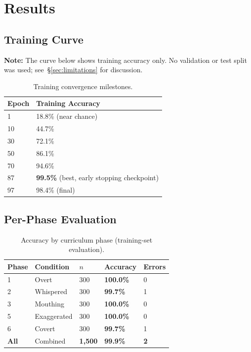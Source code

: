 \documentclass[11pt, a4paper]{article}
\begin{document}
\section{Results}
\label{sec:results}

\subsection{Training Curve}

\textbf{Note:} The curve below shows training accuracy only. No validation or test split was used; see~\S\ref{sec:limitations} for discussion.

\begin{table}[h]
\centering
\caption{Training convergence milestones.}
\label{tab:training_curve}
\begin{tabular}{@{}ll@{}}
\toprule
Epoch & Training Accuracy \\
\midrule
1  & 18.8\% (near chance) \\
10 & 44.7\% \\
30 & 72.1\% \\
50 & 86.1\% \\
70 & 94.6\% \\
87 & \textbf{99.5\%} (best, early stopping checkpoint) \\
97 & 98.4\% (final) \\
\bottomrule
\end{tabular}
\end{table}

\subsection{Per-Phase Evaluation}

\begin{table}[h]
\centering
\caption{Accuracy by curriculum phase (training-set evaluation).}
\label{tab:perphase}
\begin{tabular}{@{}lllll@{}}
\toprule
Phase & Condition & $n$ & Accuracy & Errors \\
\midrule
1 & Overt        & 300 & \textbf{100.0\%} & 0 \\
2 & Whispered    & 300 & \textbf{99.7\%}  & 1 \\
3 & Mouthing     & 300 & \textbf{100.0\%} & 0 \\
5 & Exaggerated  & 300 & \textbf{100.0\%} & 0 \\
6 & Covert       & 300 & \textbf{99.7\%}  & 1 \\
\midrule
\textbf{All} & Combined & \textbf{1{,}500} & \textbf{99.9\%} & \textbf{2} \\
\bottomrule
\end{tabular}
\end{table}
\end{document}
